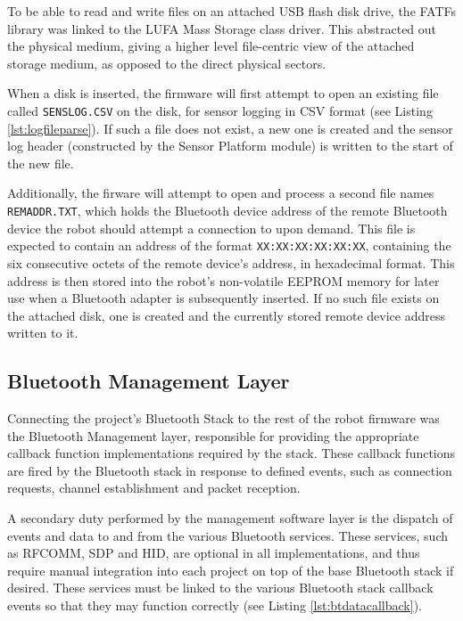 To be able to read and write files on an attached USB flash disk drive, the FATFs library was linked to the LUFA Mass Storage class driver. This abstracted out the physical medium, giving a higher level file-centric view of the attached storage medium, as opposed to the direct physical sectors.

When a disk is inserted, the firmware will first attempt to open an existing file called \texttt{SENSLOG.CSV} on the disk, for sensor logging in CSV format (see Listing \ref{lst:logfileparse}). If such a file does not exist, a new one is created and the sensor log header (constructed by the Sensor Platform module) is written to the start of the new file.



Additionally, the firware will attempt to open and process a second file names \texttt{REMADDR.TXT}, which holds the Bluetooth device address of the remote Bluetooth device the robot should attempt a connection to upon demand. This file is expected to contain an address of the format \texttt{XX:XX:XX:XX:XX:XX}, containing the six consecutive octets of the remote device's address, in hexadecimal format. This address is then stored into the robot's non-volatile EEPROM memory for later use when a Bluetooth adapter is subsequently inserted. If no such file exists on the attached disk, one is created and the currently stored remote device address written to it.

\FloatBarrier
\subsection{Bluetooth Management Layer}

Connecting the project's Bluetooth Stack to the rest of the robot firmware was the Bluetooth Management layer, responsible for providing the appropriate callback function implementations required by the stack. These callback functions are fired by the Bluetooth stack in response to defined events, such as connection requests, channel establishment and packet reception.

A secondary duty performed by the management software layer is the dispatch of events and data to and from the various Bluetooth services. These services, such as RFCOMM, SDP and HID, are optional in all implementations, and thus require manual integration into each project on top of the base Bluetooth stack if desired. These services must be linked to the various Bluetooth stack callback events so that they may function correctly (see Listing \ref{lst:btdatacallback}).

